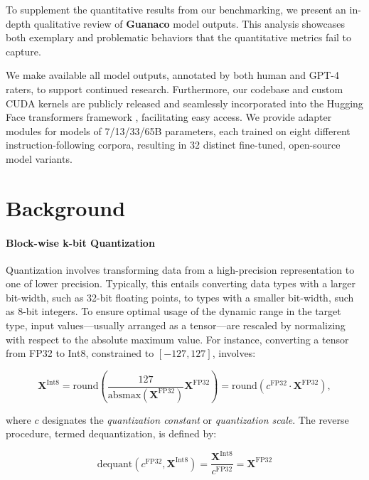 To supplement the quantitative results from our benchmarking, we present an in-depth qualitative review of \textbf{Guanaco} model outputs. This analysis showcases both exemplary and problematic behaviors that the quantitative metrics fail to capture.

We make available all model outputs, annotated by both human and GPT-4 raters, to support continued research. Furthermore, our codebase and custom CUDA kernels are publicly released and seamlessly incorporated into the Hugging Face transformers framework \citep{wolf2019huggingface}, facilitating easy access. We provide adapter modules for models of 7/13/33/65B parameters, each trained on eight different instruction-following corpora, resulting in 32 distinct fine-tuned, open-source model variants.

\section{Background}
\paragraph{Block-wise k-bit Quantization} Quantization involves transforming data from a high-precision representation to one of lower precision. Typically, this entails converting data types with a larger bit-width, such as 32-bit floating points, to types with a smaller bit-width, such as 8-bit integers. To ensure optimal usage of the dynamic range in the target type, input values—usually arranged as a tensor—are rescaled by normalizing with respect to the absolute maximum value. For instance, converting a tensor from FP32 to Int8, constrained to $[-127, 127]$, involves:

\begin{equation}
    \mathbf{X}^{ \text{Int8}} = \text{round}\left( \frac{127}{{\text{absmax}}(\mathbf{X}^{{\text{FP32}}})}\mathbf{X}^{{\text{FP32}}} \right) = \text{round}(c^{\text{FP32}}\cdot \mathbf{X}^{{\text{FP32}}}),
\end{equation}

where $c$ designates the {\em quantization constant} or {\em quantization scale}. The reverse procedure, termed dequantization, is defined by:

\begin{equation}
    \text{dequant}(c^{\text{FP32}}, \mathbf{X}^{\text{Int8}}) = \frac{\mathbf{X}^{\text{Int8}}}{c^{\text{FP32}}} = \mathbf{X}^{\text{FP32}}
\end{equation}

